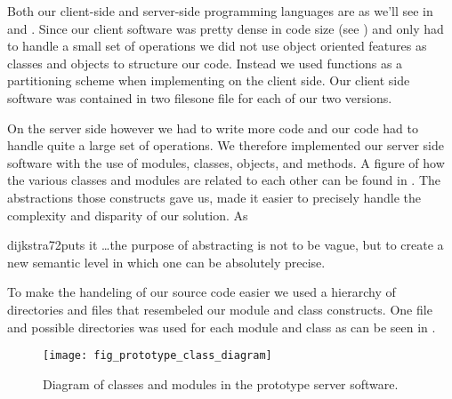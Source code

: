 Both our client-side and server-side programming languages are as we'll see in
 and
.
Since our client software was pretty dense in code size (see
) and only had to handle a small set of
operations we did not use object oriented
features as classes and objects to structure our code. Instead we used
functions as a partitioning scheme when implementing on the client side.
Our client side software was contained in two files\dash{}one file for each
of our two versions.

On the server side however we had to write more code and our code had to
handle quite a large set of operations. We therefore implemented our server
side software with the use of modules, classes, objects, and methods.
A figure of how the various classes and modules are related to each other
can be found in .
The abstractions those constructs gave us, made it easier to
precisely handle the complexity and disparity of our solution. 
As
\begin{fullquote}[\p{864}]{dijkstra72}{puts it}
  \ldots the purpose of abstracting is not to be vague, but to create a new
  semantic level in which one can be absolutely precise.
\end{fullquote}

To make the handeling of our source code easier we used a hierarchy of
directories and files that resembeled our module and class constructs. One
file and possible directories was used for each module and class
as can be seen in .

\begin{figure}
  \begin{whole}
    \centering
    \texttt{[image: fig\_prototype\_class\_diagram]}
    \caption[Prototype Class Diagram]{
      Diagram of classes and modules in the prototype server software.
    }
    \label{figure:fig.prototype.class.diagram}
  \end{whole}
\end{figure}


